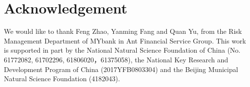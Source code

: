\section{Acknowledgement}
We would like to thank Feng Zhao, Yanming Fang and Quan Yu, from the Risk Management Department of MYbank in Ant Financial Service Group. This work is supported in part by the National Natural Science Foundation of China (No. 61772082, 61702296, 61806020，61375058), the National Key Research and Development Program of China (2017YFB0803304) and the Beijing Municipal Natural Science Foundation (4182043).